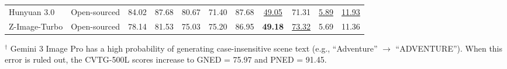 \begin{table}[t]
{\begin{tabular}{llccc|cc|cc|cc}
        Hunyuan 3.0        & Open-sourced & 84.02 & 87.68 & 80.67 & 71.40 & 87.68 & \underline{49.05} & 71.31 & \underline{5.89} & \underline{11.93} \\
        Z-Image-Turbo      & Open-sourced & 78.14 & 81.53 & 75.03 & 75.20 & 86.95 & \textbf{49.18} & \underline{73.32} & 5.69 & 11.36 \\
        \bottomrule
    \end{tabular}
    } %
    \vspace{0.5ex}
    \par\noindent\scriptsize $^\dagger$ Gemini 3 Image Pro has a high probability of generating case-insensitive scene text (e.g., ``Adventure'' $\rightarrow$ ``ADVENTURE''). When this error is ruled out, the CVTG-500L scores increase to GNED = 75.97 and PNED = 91.45.
\end{table}

